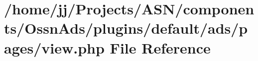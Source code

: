 \hypertarget{components_2_ossn_ads_2plugins_2default_2ads_2pages_2view_8php}{}\section{/home/jj/\+Projects/\+A\+S\+N/components/\+Ossn\+Ads/plugins/default/ads/pages/view.php File Reference}
\label{components_2_ossn_ads_2plugins_2default_2ads_2pages_2view_8php}
